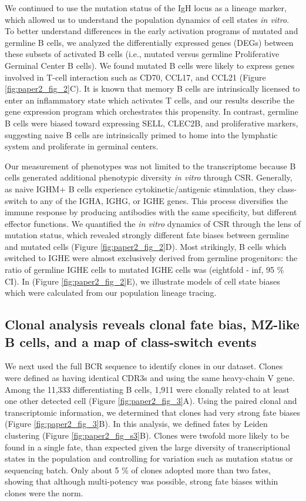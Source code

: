We continued to use the mutation status of the IgH locus as a lineage marker, which allowed us to understand the population dynamics of cell states \textit{in vitro}. To better understand differences in the early activation programs of mutated and germline B cells, we analyzed the differentially expressed genes (DEGs) between these subsets of activated B cells (i.e., mutated versus germline Proliferative Germinal Center B cells). We found mutated B cells were likely to express genes involved in T-cell interaction such as CD70, CCL17, and CCL21 (Figure \ref{fig:paper2_fig_2}C). It is known that memory B cells are intrinsically licensed to enter an inflammatory state which activates T cells\cite{liu_memory_1995, good_resting_2009}, and our results describe the gene expression program which orchestrates this propensity. In contrast, germline B cells were biased toward expressing SELL, CLEC2B, and proliferative markers, suggesting naive B cells are intrinsically primed to home into the lymphatic system and proliferate in germinal centers.

Our measurement of phenotypes was not limited to the transcriptome because B cells generated additional phenotypic diversity \textit{in vitro} through CSR. Generally, as naive IGHM+ B cells experience cytokinetic/antigenic stimulation, they class-switch to any of the IGHA, IGHG, or IGHE genes. This process diversifies the immune response by producing antibodies with the same specificity, but different effector functions. We quantified the \textit{in vitro} dynamics of CSR through the lens of mutation status, which revealed strongly different fate biases between germline and mutated cells (Figure \ref{fig:paper2_fig_2}D). Most strikingly, B cells which switched to IGHE were almost exclusively derived from germline progenitors: the ratio of germline IGHE cells to mutated IGHE cells was (eightfold - inf, 95 \% CI). In  (Figure \ref{fig:paper2_fig_2}E), we illustrate models of cell state biases which were calculated from our population lineage tracing.

\subsection{Clonal analysis reveals clonal fate bias, MZ-like B cells, and a map of class-switch events
}
We next used the full BCR sequence to identify clones in our dataset. Clones were defined as having identical CDR3s and using the same heavy-chain V gene. Among the 11,333 differentiating B cells, 1,911 were clonally related to at least one other detected cell (Figure \ref{fig:paper2_fig_3}A). Using the paired clonal and transcriptomic information, we determined that clones had very strong fate biases (Figure \ref{fig:paper2_fig_3}B). In this analysis, we defined fates by Leiden clustering (Figure \ref{fig:paper2_fig_s3}B). Clones were twofold more likely to be found in a single fate, than expected given the large diversity of transcriptional states in the population and controlling for variation such as mutation status or sequencing batch. Only about 5 \% of clones adopted more than two fates, showing that although multi-potency was possible, strong fate biases within clones were the norm.


